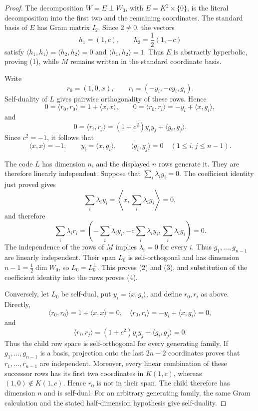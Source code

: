 \documentclass[12pt]{article}
\begin{document}
\begin{proof}
The decomposition \(W=E\perp W_0\), with \(E=K^2\times\{0\}\), is
the literal decomposition into the first two and the remaining coordinates.
The standard basis of \(E\) has Gram matrix \(I_2\).  Since \(2\ne0\), the
vectors
\[
h_1=(1,c),\qquad h_2=\frac12(1,-c)
\]
satisfy
\(\langle h_1,h_1\rangle=\langle h_2,h_2\rangle=0\) and
\(\langle h_1,h_2\rangle=1\).  Thus \(E\) is abstractly hyperbolic,
proving (1), while \(M\) remains written in the standard coordinate basis.

Write
\[
r_0=(1,0,x),\qquad r_i=(-y_i,-cy_i,g_i).
\]
Self-duality of \(L\) gives pairwise orthogonality of these rows.  Hence
\[
0=\langle r_0,r_0\rangle=1+\langle x,x\rangle,
\qquad
0=\langle r_0,r_i\rangle=-y_i+\langle x,g_i\rangle,
\]
and
\[
0=\langle r_i,r_j\rangle=(1+c^2)y_iy_j+\langle g_i,g_j\rangle.
\]
Since \(c^2=-1\), it follows that
\[
\langle x,x\rangle=-1,
\qquad
y_i=\langle x,g_i\rangle,
\qquad \langle g_i,g_j\rangle=0
\quad(1\le i,j\le n-1).
\]

The code \(L\) has dimension \(n\), and the displayed \(n\) rows generate it.
They are therefore linearly independent.
Suppose that
\(\sum_i\lambda_i g_i=0\).  The coefficient identity just proved gives
\[
\sum_i\lambda_i y_i
=\left\langle x,\sum_i\lambda_i g_i\right\rangle=0,
\]
and therefore
\[
\sum_i\lambda_i r_i
=\left(-\sum_i\lambda_i y_i,
       -c\sum_i\lambda_i y_i,
       \sum_i\lambda_i g_i\right)=0.
\]
The independence of the rows of \(M\) implies \(\lambda_i=0\) for every
\(i\).  Thus \(g_1,\ldots,g_{n-1}\) are linearly independent.  Their span
\(L_0\) is self-orthogonal and has dimension
\(n-1=\frac12\dim W_0\), so \(L_0=L_0^\perp\).  This proves (2) and (3),
and substitution of the coefficient identity into the rows proves (4).

Conversely, let \(L_0\) be self-dual, put
\(y_i=\langle x,g_i\rangle\), and define \(r_0,r_i\) as above.  Directly,
\[
\langle r_0,r_0\rangle=1+\langle x,x\rangle=0,
\quad
\langle r_0,r_i\rangle=-y_i+\langle x,g_i\rangle=0,
\]
and
\[
\langle r_i,r_j\rangle
=(1+c^2)y_iy_j+\langle g_i,g_j\rangle=0.
\]
Thus the child row space is self-orthogonal for every generating family.
If \(g_1,\ldots,g_{n-1}\) is a basis, projection onto the last
\(2n-2\) coordinates proves that \(r_1,\ldots,r_{n-1}\) are independent.
Moreover, every linear combination of these successor rows has its first
two coordinates in \(K(1,c)\), whereas \((1,0)\notin K(1,c)\).  Hence
\(r_0\) is not in their span.  The child therefore has dimension \(n\) and
is self-dual.  For an arbitrary generating family, the same Gram calculation
and the stated half-dimension hypothesis give self-duality.
\end{proof}
\end{document}
